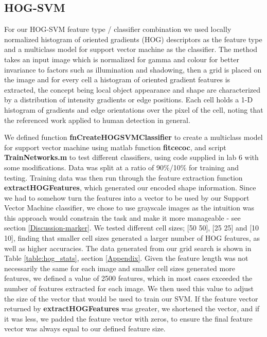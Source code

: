 \subsection{HOG-SVM}  
For our HOG-SVM feature type / classifier combination we used locally normalized histogram of oriented gradients (HOG) descriptors \cite{citeulike:335784} as the feature type and a multiclass model for support vector machine as the classifier. The method takes an input image which is normalized for gamma and colour for better invariance to factors such as illumination and shadowing, then a grid is placed on the image and for every cell a histogram of oriented gradient features is extracted, the concept being local object appearance and shape are characterized by a distribution of intensity gradients or edge positions. Each cell holds a 1-D histogram of gradients and edge orientations over the pixel of the cell, noting that the referenced work applied to human detection in general. 

We defined function \textbf{fnCreateHOGSVMClassifier} to create a multiclass model for support vector machine using matlab function \textbf{fitcecoc}, and script \textbf{TrainNetworks.m} to test different classifiers, using code supplied in lab 6 \cite{INM460-lab-wk6} with some modifications. Data was split at a ratio of 90\%/10\% for training and testing. Training data was then run through the feature extraction function  \textbf{extractHOGFeatures}, which generated our encoded shape information. Since we had to somehow turn the features into a vector to be used by our Support Vector Machine classifier, we chose to use grayscale images as the intuition was this approach would constrain the task and make it more manageable - see section \ref{Discussion-marker}. We tested different cell sizes; [50 50], [25 25] and [10 10], finding that smaller cell sizes generated a larger number of HOG features, as well as higher accuracies. The data generated from our grid search is shown in Table \ref{table:hog_stats}, section \ref{Appendix}. Given the feature length was not necessarily the same for each image and smaller cell sizes generated more features, we defined a value of 2500 features, which in most cases exceeded the number of features extracted for each image. We then used this value to adjust the size of the vector that would be used to train our SVM. If the feature vector returned by \textbf{extractHOGFeatures} was greater, we shortened the vector, and if it was less, we padded the feature vector with zeros, to ensure the final feature vector was always equal to our defined feature size.

